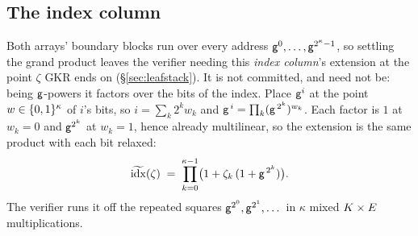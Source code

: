 \subsection{The index column}\label{sec:idxcol}

Both arrays' boundary blocks run over every address $\mathsf{g}^{0},\dots,\mathsf{g}^{2^{\kappa}-1}$, so settling the grand product leaves the verifier needing this \emph{index column}'s extension at the point $\zeta$ GKR ends on (\S\ref{sec:leafstack}). It is not committed, and need not be: being $\mathsf{g}$-powers it factors over the bits of the index. Place $\mathsf{g}^{i}$ at the point $w\in\{0,1\}^{\kappa}$ of $i$'s bits, so $i=\sum_k2^{k}w_k$ and $\mathsf{g}^{\,i}=\prod_k(\mathsf{g}^{\,2^{k}})^{w_k}$. Each factor is $1$ at $w_k=0$ and $\mathsf{g}^{2^{k}}$ at $w_k=1$, hence already multilinear, so the extension is the same product with each bit relaxed:
\[
  \widetilde{\mathrm{idx}}(\zeta)\;=\;\prod_{k=0}^{\kappa-1}\bigl(1+\zeta_k\,(1+\mathsf{g}^{\,2^{k}})\bigr).
\]
The verifier runs it off the repeated squares $\mathsf{g}^{2^{0}},\mathsf{g}^{2^{1}},\dots$ in $\kappa$ mixed $K\times E$ multiplications.
